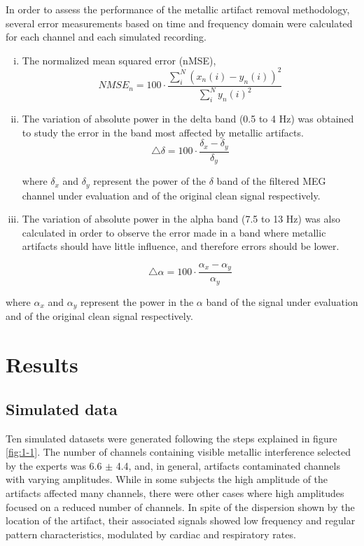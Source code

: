 In order to assess the performance of the metallic artifact removal methodology, several error measurements based on time and frequency domain were calculated for each channel and each simulated recording.

\begin{enumerate} [(i)]
\item The normalized mean squared error (nMSE),
  \begin{equation}
	NMSE_n = 100 \cdot \frac{\sum_{i}^{N} (x_{n}(i)-y_{n}(i))^2}{\sum_{i}^N y_{n}(i)^2}
  \end{equation}
  
\item The variation of absolute power in the delta band (0.5 to 4 Hz) was obtained to study the error in the band most affected by metallic artifacts.
 \begin{equation}
	\bigtriangleup \delta  = 100 \cdot \frac{{\delta}_x -{\delta}_y}{{\delta}_y}
  \end{equation}

where ${\delta}_x$ and ${\delta}_y$ represent the power of the $\delta$ band of the filtered MEG channel under evaluation and of the original clean signal respectively.


\item The variation of absolute power in the alpha band (7.5 to 13 Hz) was also calculated in order to observe the error made in a band where metallic artifacts should have little influence, and therefore errors should be lower.
  
  \begin{equation}
	\bigtriangleup \alpha  = 100 \cdot \frac{{\alpha}_x -{\alpha}_y}{{\alpha}_y}
  \end{equation}
\end{enumerate}

where ${\alpha}_x$ and ${\alpha}_y$ represent the power in the $\alpha$ band of the signal under evaluation and of the original clean signal respectively.

\section{Results}

\subsection{Simulated data}

Ten simulated datasets were generated following the steps explained in figure \ref{fig:1-1}. The number of channels containing visible metallic interference selected by the experts was 6.6 $\pm$ 4.4, and, in general, artifacts contaminated channels with varying amplitudes. While in some subjects the high amplitude of the artifacts affected many channels, there were other cases where high amplitudes focused on a reduced number of channels. In spite of the dispersion shown by the location of the artifact, their associated signals showed low frequency and regular pattern characteristics, modulated by cardiac and respiratory rates.

